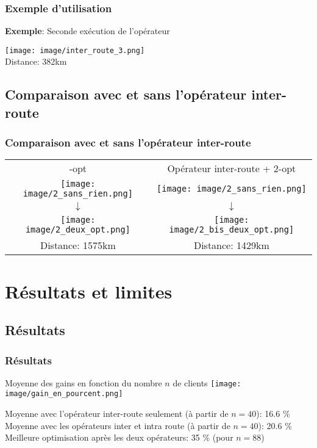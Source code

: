 \documentclass[10pt]{beamer}
\begin{document}
	\begin{frame}
		\frametitle{Exemple d'utilisation}
		\begin{exampleblock}{\textbf{Exemple}: Seconde exécution de l'opérateur}
			\begin{center}
				\texttt{[image: image/inter\_route\_3.png]}  \\
				Distance: 382km
			\end{center}
		\end{exampleblock}
	\end{frame}

	\subsection{Comparaison avec et sans l'opérateur inter-route}

	\begin{frame}
		\frametitle{Comparaison avec et sans l'opérateur inter-route}
		\begin{center}
			\begin{tabular}{c c}
				\quad \quad \quad 2-opt & Opérateur inter-route + 2-opt  \\
				\quad \quad \quad \texttt{[image: image/2\_sans\_rien.png]} \quad & \texttt{[image: image/2\_sans\_rien.png]}  \\ 
				\quad \quad \quad \( \downarrow \) & \( \downarrow \)  \\
				\quad \quad \quad \texttt{[image: image/2\_deux\_opt.png]} \quad & \texttt{[image: image/2\_bis\_deux\_opt.png]}  \\
				\quad \quad \quad Distance: 1575km & Distance: 1429km
			\end{tabular}
		\end{center}
	\end{frame}

	\section{Résultats et limites}

	\subsection{Résultats}

	\begin{frame}
		\frametitle{Résultats}
		\begin{center}
			Moyenne des gains en fonction du nombre \( n \) de clients
			\texttt{[image: image/gain\_en\_pourcent.png]}
		\end{center}
		\small{Moyenne avec l'opérateur inter-route seulement (à partir de \( n=40 \)): 16.6 \%  \\
		Moyenne avec les opérateurs inter et intra route (à partir de \( n=40 \)): 20.6 \%  \\
		Meilleure optimisation après les deux opérateurs: 35 \% (pour \( n = 88 \))}
	\end{frame}
\end{document}
